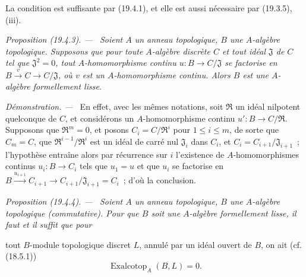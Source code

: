 \documentclass[10pt,oneside]{book}
\makeatletter
\newcommand{\setmanualcurrentlabel}[1]{\def\@currentlabel{#1}}
\newcommand{\oldpage}[2][]{%
  \setcounter{footnote}{0}%
  \marginpar{\scriptsize\textbf{#1}~|~#2}\ignorespaces}
\newenvironment{proposition}[1][]{%
  \setmanualcurrentlabel{#1}\par\medskip\noindent\itshape Proposition (#1). ---\ }{\par}
\newenvironment{proof}{%
  \par\medskip\noindent\textit{Démonstration. ---\ }}{\par}
\makeatother
\begin{document}
La condition est suffisante par (19.4.1), et elle est aussi nécessaire par
(19.3.5), (iii).

\begin{proposition}[19.4.3]
\label{0.19.4.3-fr}
Soient $A$ un anneau topologique, $B$ une $A$-algèbre topologique. Supposons
que pour toute $A$-algèbre discrète $C$ et tout idéal $\mathfrak J$ de $C$
tel que $\mathfrak J^2=0$, tout $A$-homomorphisme continu
$u:B\to C/\mathfrak J$ se factorise en
$B\xrightarrow{v}C\to C/\mathfrak J$, où $v$ est un $A$-homomorphisme
continu. Alors $B$ est une $A$-algèbre formellement lisse.
\end{proposition}

\begin{proof}
En effet, avec les mêmes notations, soit $\mathfrak R$ un idéal nilpotent
quelconque de $C$, et considérons un $A$-homomorphisme continu
$u':B\to C/\mathfrak R$. Supposons que $\mathfrak R^m=0$, et posons
$C_i=C/\mathfrak R^i$ pour $1\leq i\leq m$, de sorte que $C_m=C$, que
$\mathfrak R^{i-1}/\mathfrak R^i$ est un idéal de carré nul
$\mathfrak J_i$ dans $C_i$, et $C_i=C_{i+1}/\mathfrak J_{i+1}$~;
l'hypothèse entraîne alors par récurrence sur $i$ l'existence de
$A$-homomorphismes continus $u_i:B\to C_i$ tels que $u_1=u$ et que $u_i$
se factorise en
$B\xrightarrow{u_{i+1}}C_{i+1}\to C_{i+1}/\mathfrak J_{i+1}=C_i$~;
d'où la conclusion.
\end{proof}

\begin{proposition}[19.4.4]
\label{0.19.4.4-fr}
Soient $A$ un anneau topologique, $B$ une $A$-algèbre topologique
(commutative). Pour que $B$ soit une $A$-algèbre formellement lisse, il faut et
il suffit que pour

\oldpage[0\textsubscript{IV-1}]{87}

tout $B$-module topologique discret $L$, annulé par un idéal ouvert de $B$, on
ait (cf. (18.5.1))
\[
  \operatorname{Exalcotop}_A(B,L)=0.
\]
\end{proposition}
\end{document}

